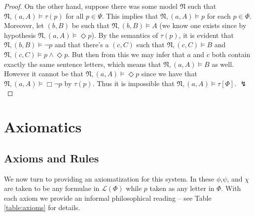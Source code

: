 \documentclass[11pt]{article}
\numberwithin{equation}{subsection}
\newcommand{\Nec}{\Box}
\newcommand{\Pos}{\Diamond}
\begin{document}
\begin{proof}
On the other hand, suppose there was some model $\mathfrak{N}$ such that $\mathfrak{N}, ( a, A) \models \tau(p)$ for all $p \in \Psi$.  This implies that $\mathfrak{N}, ( a, A) \models p$ for each $p \in \Phi$.  Moreover, let $( b, B)$ be such that $\mathfrak{N},( b, B)\models A$ (we know one exists since by hypothesis $\mathfrak{N}, ( a, A) \models \Pos p$).  By the semantics of $\tau(p)$, it is evident that $\mathfrak{N}, ( b, B) \models \neg p$ and that there's a $( c, C)$ such that $\mathfrak{N},( c,C ) \models B$ and $\mathfrak{N},( c,C ) \models p \wedge \Pos p$.  But then from this we may infer that $a$ and $c$ both contain exactly the same sentence letters, which means that $\mathfrak{N},( a,A) \models B$ as well.  However it cannot be that $\mathfrak{N},( a,A ) \models \Pos p$ since we have that $\mathfrak{N},( a,A ) \models \Nec \neg p$ by $\tau(p)$. Thus it is impossible that $\mathfrak{N},( a, A) \models \tau[\Phi]$. $\lightning$
\end{proof}

\section{Axiomatics}

\subsection{Axioms and Rules}

We now turn to providing an axiomatization for this system.  In these $\phi$,$\psi$, and $\chi$ are taken to be any formulae in $\mathcal{L}(\Phi)$ while  $p$ taken as any letter in $\Phi$.  With each axiom we provide an informal philosophical reading -- see Table \ref{table:axioms} for details.
\end{document}
